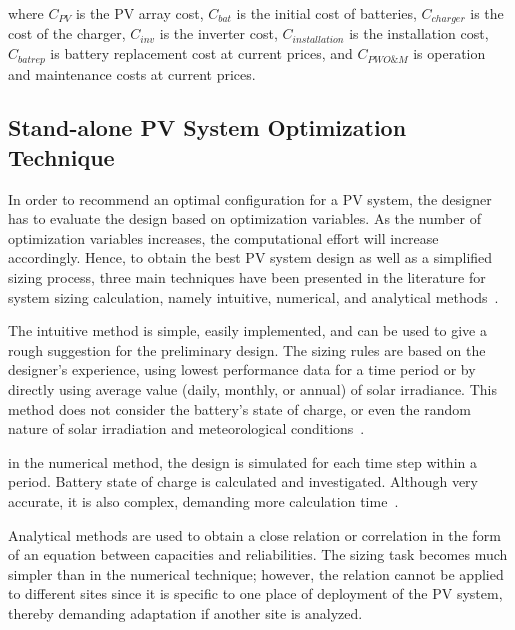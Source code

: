 \noindent where $C_{PV}$ is the PV array cost, $C_{bat}$ is the initial cost of batteries, $C_{charger}$ is the cost of the charger, $C_{inv}$ is the inverter cost, $C_{installation}$ is the installation cost, $C_{batrep}$ is battery replacement cost at current prices, and $C_{PWO\&M}$ is operation and maintenance costs at current prices.

\subsection{Stand-alone PV System Optimization Technique}

In order to recommend an optimal configuration for a PV system, 
the designer has to evaluate the design based on optimization variables. 
As the number of optimization variables increases, the computational effort will increase accordingly. Hence, to obtain the best PV system design as well as a simplified sizing process, three main techniques have been presented in the literature for system sizing calculation, namely intuitive, numerical, and analytical methods~\cite{Zhou2010}.

The intuitive method is simple, easily implemented, and can be used to give a rough suggestion for the preliminary design. The sizing rules are based on the designer's experience, using lowest performance data for a time period or by directly using average value (daily, monthly, or annual) of solar irradiance. This method does not consider the battery's state of charge, or even the random nature of solar irradiation and meteorological conditions~\cite{Alsadi2018}.

in the numerical method, the design is simulated for each time step within a period. Battery state of charge is calculated and investigated. Although very accurate, it is also complex, demanding more calculation time~\cite{Park2004}.

Analytical methods are used to obtain a close relation or correlation in the form of an equation between capacities and reliabilities. The sizing task becomes much simpler than in the numerical technique; however, the relation cannot be applied to different sites since it is specific to one place of deployment of the PV system, thereby demanding adaptation if another site is analyzed.

